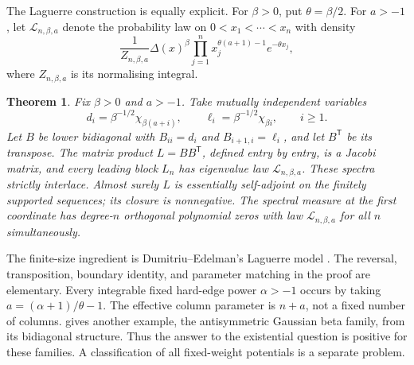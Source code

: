 \documentclass[10pt]{amsart}
\newtheorem{theorem}{Theorem}[section]
\newcommand{\T}{\mathsf T}
\newcommand{\Lag}{\mathcal L}
\begin{document}
The Laguerre construction is equally explicit. For $\beta>0$, put
$\theta=\beta/2$. For $a>-1$, let $\Lag_{n,\beta,a}$ denote the probability
law on $0<x_1<\cdots<x_n$ with density
\begin{equation}\label{eq:lag}
 \frac{1}{Z_{n,\beta,a}}\Delta(x)^\beta
 \prod_{j=1}^n x_j^{\theta(a+1)-1}e^{-\theta x_j},
\end{equation}
where $Z_{n,\beta,a}$ is its normalising integral.

\begin{theorem}\label{thm:main}
Fix $\beta>0$ and $a>-1$. Take mutually independent variables
\begin{equation}\label{eq:chi}
 d_i=\beta^{-1/2}\chi_{\beta(a+i)},\qquad
 \ell_i=\beta^{-1/2}\chi_{\beta i},\qquad i\geq1.
\end{equation}
Let $B$ be lower bidiagonal with $B_{ii}=d_i$ and
$B_{i+1,i}=\ell_i$, and let $B^\T$ be its transpose. The matrix
product $L=BB^\T$, defined entry by entry, is a Jacobi matrix,
and every leading block $L_n$ has eigenvalue law $\Lag_{n,\beta,a}$.
These spectra strictly interlace. Almost surely $L$ is essentially
self-adjoint on the finitely supported sequences; its closure is
nonnegative. The spectral measure at the first coordinate has
degree-$n$ orthogonal polynomial zeros with law $\Lag_{n,\beta,a}$
for all $n$ simultaneously.
\end{theorem}

The finite-size ingredient is Dumitriu--Edelman's Laguerre model
\cite[Theorem~3.4]{DE}. The reversal, transposition, boundary identity,
and parameter matching in the proof are elementary. Every integrable
fixed hard-edge power $\alpha>-1$ occurs by taking
$a=(\alpha+1)/\theta-1$. The effective column parameter is $n+a$,
not a fixed number of columns.  gives another example,
the antisymmetric Gaussian beta family, from its bidiagonal structure.
Thus the answer to the existential question is positive for these
families. A classification of all fixed-weight potentials is a separate
problem.
\end{document}
